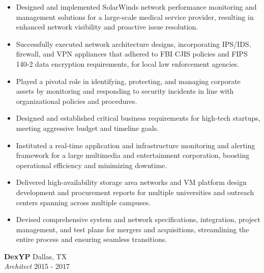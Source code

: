 \documentclass[a4paper]{article}
\begin{document}
\begin{itemize} \itemsep 1pt
\item Designed and implemented SolarWinds network performance monitoring and management solutions for a large-scale medical service provider, resulting in enhanced network visibility and proactive issue resolution.
	\item Successfully executed network architecture designs, incorporating IPS/IDS, firewall, and VPN appliances that adhered to FBI CJIS policies and FIPS 140-2 data encryption requirements, for local law enforcement agencies.
	\item Played a pivotal role in identifying, protecting, and managing corporate assets by monitoring and responding to security incidents in line with organizational policies and procedures.
	\item Designed and established critical business requirements for high-tech startups, meeting aggressive budget and timeline goals.
	\item Instituted a real-time application and infrastructure monitoring and alerting framework for a large multimedia and entertainment corporation, boosting operational efficiency and minimizing downtime.
	\item Delivered high-availability storage area networks and VM platform design development and procurement reports for multiple universities and outreach centers spanning across multiple campuses.
	\item Devised comprehensive system and network specifications, integration, project management, and test plans for mergers and acquisitions, streamlining the entire process and ensuring seamless transitions.
\end{itemize}
\textbf{DexYP} \hfill Dallas, TX\\
\textit{Architect} \hfill 2015 - 2017\\
\vspace{-1mm}
\end{document}
